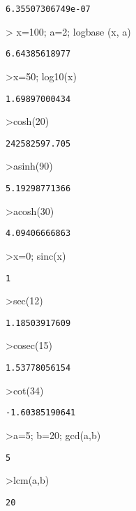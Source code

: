 \documentclass[
]{book}
\begin{document}
\begin{verbatim}
6.35507306749e-07
\end{verbatim}

\textgreater{} x=100; a=2; logbase (x, a)

\begin{verbatim}
6.64385618977
\end{verbatim}

\textgreater x=50; log10(x)

\begin{verbatim}
1.69897000434
\end{verbatim}

\textgreater cosh(20)

\begin{verbatim}
242582597.705
\end{verbatim}

\textgreater asinh(90)

\begin{verbatim}
5.19298771366
\end{verbatim}

\textgreater acosh(30)

\begin{verbatim}
4.09406666863
\end{verbatim}

\textgreater x=0; sinc(x)

\begin{verbatim}
1
\end{verbatim}

\textgreater sec(12)

\begin{verbatim}
1.18503917609
\end{verbatim}

\textgreater cosec(15)

\begin{verbatim}
1.53778056154
\end{verbatim}

\textgreater cot(34)

\begin{verbatim}
-1.60385190641
\end{verbatim}

\textgreater a=5; b=20; gcd(a,b)

\begin{verbatim}
5
\end{verbatim}

\textgreater lcm(a,b)

\begin{verbatim}
20
\end{verbatim}
\end{document}
